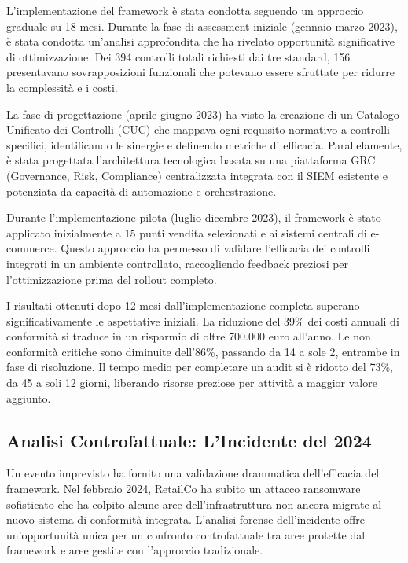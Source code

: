 L'implementazione del framework è stata condotta seguendo un approccio graduale su 18 mesi. Durante la fase di assessment iniziale (gennaio-marzo 2023), è stata condotta un'analisi approfondita che ha rivelato opportunità significative di ottimizzazione. Dei 394 controlli totali richiesti dai tre standard, 156 presentavano sovrapposizioni funzionali che potevano essere sfruttate per ridurre la complessità e i costi.

La fase di progettazione (aprile-giugno 2023) ha visto la creazione di un Catalogo Unificato dei Controlli (CUC) che mappava ogni requisito normativo a controlli specifici, identificando le sinergie e definendo metriche di efficacia. Parallelamente, è stata progettata l'architettura tecnologica basata su una piattaforma GRC (Governance, Risk, Compliance) centralizzata integrata con il SIEM esistente e potenziata da capacità di automazione e orchestrazione.

Durante l'implementazione pilota (luglio-dicembre 2023), il framework è stato applicato inizialmente a 15 punti vendita selezionati e ai sistemi centrali di e-commerce. Questo approccio ha permesso di validare l'efficacia dei controlli integrati in un ambiente controllato, raccogliendo feedback preziosi per l'ottimizzazione prima del rollout completo.

I risultati ottenuti dopo 12 mesi dall'implementazione completa superano significativamente le aspettative iniziali. La riduzione del 39\% dei costi annuali di conformità si traduce in un risparmio di oltre 700.000 euro all'anno. Le non conformità critiche sono diminuite dell'86\%, passando da 14 a sole 2, entrambe in fase di risoluzione. Il tempo medio per completare un audit si è ridotto del 73\%, da 45 a soli 12 giorni, liberando risorse preziose per attività a maggior valore aggiunto.

\subsection{\texorpdfstring{Analisi Controfattuale: L'Incidente del 2024}{4.4.2 - Analisi Controfattuale: L'Incidente del 2024}}
\label{subsec:4.4.2_controfattuale}

Un evento imprevisto ha fornito una validazione drammatica dell'efficacia del framework. Nel febbraio 2024, RetailCo ha subito un attacco ransomware sofisticato che ha colpito alcune aree dell'infrastruttura non ancora migrate al nuovo sistema di conformità integrata. L'analisi forense dell'incidente offre un'opportunità unica per un confronto controfattuale tra aree protette dal framework e aree gestite con l'approccio tradizionale.

